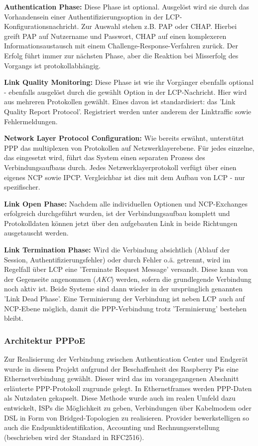 \textbf{Authentication Phase:}
Diese Phase ist optional. Ausgelöst wird sie durch das Vorhandensein einer
Authentifizierungsoption in der LCP-Konfigurationsnachricht.
Zur Auswahl stehen z.B. \ac{PAP} oder \ac{CHAP}.
Hierbei greift PAP auf Nutzername und Passwort, CHAP auf einen komplexeren Informationsaustausch
mit einem Challenge-Response-Verfahren zurück. Der Erfolg führt immer zur nächsten
Phase, aber die Reaktion bei Misserfolg des Vorgangs ist protokollabhängig.

\textbf{Link Quality Monitoring:}
Diese Phase ist wie ihr Vorgänger ebenfalls optional - ebenfalls ausgelöst durch
die gewählt Option in der LCP-Nachricht.
Hier wird aus mehreren Protokollen gewählt. Eines davon ist standardisiert:
das 'Link Quality Report Protocol'. Registriert werden unter anderem der Linktraffic
sowie Fehlermeldungen.

\textbf{Network Layer Protocol Configuration:}
Wie bereits erwähnt, unterstützt PPP  das multiplexen von Protokollen auf
Netzwerklayerebene. Für jedes einzelne, das eingesetzt wird,
führt das System einen separaten Prozess des Verbindungsaufbaus durch.
Jedes Netzwerklayerprotokoll verfügt über einen eigenes \ac{NCP} sowie \ac{IPCP}.
Vergleichbar ist dies mit dem Aufbau von \ac{LCP} - nur spezifischer.

\textbf{Link Open Phase:}
Nachdem alle individuellen Optionen und NCP-Exchanges erfolgreich durchgeführt wurden,
ist der Verbindungsaufbau komplett und Protokolldaten können jetzt über den aufgebauten
Link in beide Richtungen ausgetauscht werden.

\textbf{Link Termination Phase:}
Wird die Verbindung absichtlich (Ablauf der Session, Authentifizierungsfehler)
oder durch Fehler o.ä. getrennt, wird im Regelfall über \ac{LCP}
eine 'Terminate Request Message' versandt. Diese kann von der Gegenseite
angenommen (\textit{AKC}) werden, sofern die grundlegende Verbindung noch aktiv ist.
Beide Systeme sind dann wieder in der ursprünglich genannten 'Link Dead Phase'.
Eine Terminierung der Verbindung ist neben \ac{LCP} auch auf \ac{NCP}-Ebene möglich,
damit die PPP-Verbindung trotz 'Terminierung' bestehen bleibt.


\subsubsection[Architektur PPPoE (Schenkel)]{Architektur PPPoE}
\label{subsubsection:architecture_pppoe}
Zur Realisierung der Verbindung zwischen Authentication Center und
Endgerät wurde in diesem Projekt aufgrund der Beschaffenheit des Raspberry Pis eine
Ethernetverbindung gewählt. Dieser wird das im vorangegangenen
Abschnitt erläuterte \ac{PPP}-Protokoll zugrunde gelegt.
In Ethernetframes werden PPP-Daten als Nutzdaten gekapselt.
Diese Methode wurde auch im realen Umfeld dazu entwickelt, \acp{ISP} die
Möglichkeit zu geben, Verbindungen über Kabelmodem oder DSL in Form
von Bridged-Topologien zu realisieren. Provider bewerkstelligen
so auch die Endpunktidentifikation, Accounting und Rechnungserstellung
(beschrieben wird der Standard in RFC2516).

